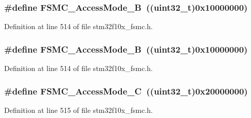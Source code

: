 \subsubsection[{\texorpdfstring{F\+S\+M\+C\+\_\+\+Access\+Mode\+\_\+B}{FSMC_AccessMode_B}}]{\setlength{\rightskip}{0pt plus 5cm}\#define F\+S\+M\+C\+\_\+\+Access\+Mode\+\_\+B~(({\bf uint32\+\_\+t})0x10000000)}\hypertarget{group___f_s_m_c___access___mode_ga2d6ce7481eb5e0e86fda727c646e4109}{}\label{group___f_s_m_c___access___mode_ga2d6ce7481eb5e0e86fda727c646e4109}


Definition at line 514 of file stm32f10x\+\_\+fsmc.\+h.

\subsubsection[{\texorpdfstring{F\+S\+M\+C\+\_\+\+Access\+Mode\+\_\+B}{FSMC_AccessMode_B}}]{\setlength{\rightskip}{0pt plus 5cm}\#define F\+S\+M\+C\+\_\+\+Access\+Mode\+\_\+B~(({\bf uint32\+\_\+t})0x10000000)}\hypertarget{group___f_s_m_c___access___mode_ga2d6ce7481eb5e0e86fda727c646e4109}{}\label{group___f_s_m_c___access___mode_ga2d6ce7481eb5e0e86fda727c646e4109}


Definition at line 514 of file stm32f10x\+\_\+fsmc.\+h.

\subsubsection[{\texorpdfstring{F\+S\+M\+C\+\_\+\+Access\+Mode\+\_\+C}{FSMC_AccessMode_C}}]{\setlength{\rightskip}{0pt plus 5cm}\#define F\+S\+M\+C\+\_\+\+Access\+Mode\+\_\+C~(({\bf uint32\+\_\+t})0x20000000)}\hypertarget{group___f_s_m_c___access___mode_ga83ffa035cf2e95c957b67a2e8b879e86}{}\label{group___f_s_m_c___access___mode_ga83ffa035cf2e95c957b67a2e8b879e86}


Definition at line 515 of file stm32f10x\+\_\+fsmc.\+h.

